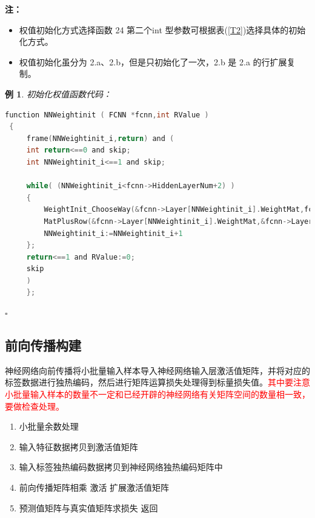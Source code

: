 \documentclass[UTF-8]{progbookcn}
\newtheorem{example}{例}[chapter]         %
\begin{document}
\begin{table}[!h]
\centering
\caption{权值初始化相关函数}
\end{table}
\noindent\textbf{注：}
\begin{itemize}
  \item 权值初始化方式选择函数 24 第二个int 型参数可根据表(\ref{T2})选择具体的初始化方式。
  \item 权值初始化虽分为 2.a、2.b，但是只初始化了一次，2.b 是 2.a 的行扩展复制。
\end{itemize}

\begin{example}
初始化权值函数代码：
\begin{lstlisting}[language=C,caption={函数 25 NNWeightinit}]
 function NNWeightinit ( FCNN *fcnn,int RValue )
 {
     frame(NNWeightinit_i,return) and (
     int return<==0 and skip;
     int NNWeightinit_i<==1 and skip;

     while( (NNWeightinit_i<fcnn->HiddenLayerNum+2) )
     {
         WeightInit_ChooseWay(&fcnn->Layer[NNWeightinit_i].WeightMat,fcnn->WeightInitWayNum);               // 步骤2.a
         MatPlusRow(&fcnn->Layer[NNWeightinit_i].WeightMat,&fcnn->Layer[NNWeightinit_i].WeightBiasMat);     // 步骤2.b  仅仅是行扩展复制  并没有重新初始化  也不能重新初始化
         NNWeightinit_i:=NNWeightinit_i+1
     };
     return<==1 and RValue:=0;
     skip
     )
     };
\end{lstlisting}\hfill$\square$
\end{example}



\subsection{前向传播构建}
\begin{keypoint}
神经网络向前传播将小批量输入样本导入神经网络输入层激活值矩阵，并将对应的标签数据进行独热编码，然后进行矩阵运算损失处理得到标量损失值。\textcolor{red}{其中要注意小批量输入样本的数量不一定和已经开辟的神经网络有关矩阵空间的数量相一致，要做检查处理。}
\begin{enumerate}
  \item 小批量余数处理
  \item 输入特征数据拷贝到激活值矩阵
  \item 输入标签独热编码数据拷贝到神经网络独热编码矩阵中
  \item 前向传播矩阵相乘  激活  扩展激活值矩阵
  \item 预测值矩阵与真实值矩阵求损失  返回
\end{enumerate}
\end{keypoint}
\end{document}
